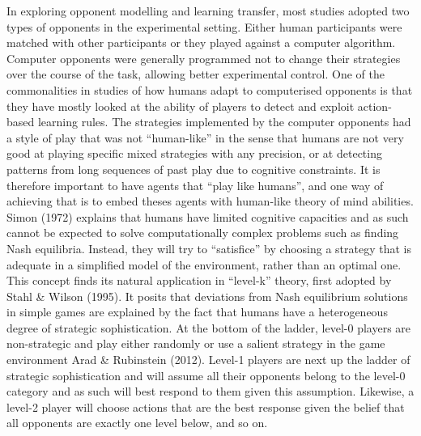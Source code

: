 \documentclass[man,floatsintext]{apa6}
\begin{document}
In exploring opponent modelling and learning transfer, most studies adopted two types of opponents in the experimental setting. Either human participants were matched with other participants or they played against a computer algorithm. Computer opponents were generally programmed not to change their strategies over the course of the task, allowing better experimental control. One of the commonalities in studies of how humans adapt to computerised opponents is that they have mostly looked at the ability of players to detect and exploit action-based learning rules. The strategies implemented by the computer opponents had a style of play that was not \enquote{human-like} in the sense that humans are not very good at playing specific mixed strategies with any precision, or at detecting patterns from long sequences of past play due to cognitive constraints. It is therefore important to have agents that \enquote{play like humans}, and one way of achieving that is to embed theses agents with human-like theory of mind abilities. Simon (1972) explains that humans have limited cognitive capacities and as such cannot be expected to solve computationally complex problems such as finding Nash equilibria. Instead, they will try to \enquote{satisfice} by choosing a strategy that is adequate in a simplified model of the environment, rather than an optimal one. This concept finds its natural application in \enquote{level-k} theory, first adopted by Stahl \& Wilson (1995). It posits that deviations from Nash equilibrium solutions in simple games are explained by the fact that humans have a heterogeneous degree of strategic sophistication. At the bottom of the ladder, level-0 players are non-strategic and play either randomly or use a salient strategy in the game environment Arad \& Rubinstein (2012). Level-1 players are next up the ladder of strategic sophistication and will assume all their opponents belong to the level-0 category and as such will best respond to them given this assumption. Likewise, a level-2 player will choose actions that are the best response given the belief that all opponents are exactly one level below, and so on.
\end{document}
